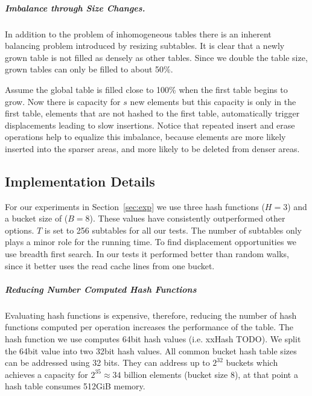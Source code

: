 \documentclass[a4paper,UKenglish]{lipics-v2016}
\begin{document}
\subparagraph*{Imbalance through Size Changes.}
In addition to the problem of inhomogeneous tables there is an
inherent balancing problem introduced by resizing subtables. It is
clear that a newly grown table is not filled as densely as other
tables.  Since we double the table size, grown tables can only be
filled to about 50\%.

Assume the global table is filled close to 100\% when the first table
begins to grow.  Now there is capacity for $s$ new elements but this
capacity is only in the first table, elements that are not hashed to
the first table, automatically trigger displacements leading to slow
insertions.  Notice that repeated insert and erase operations help to
equalize this imbalance, because elements are more likely inserted
into the sparser areas, and more likely to be deleted from denser
areas.


\subsection{Implementation Details}
For our experiments in Section~\ref{sec:exp} we use three hash
functions ($H=3$) and a bucket size of ($B=8$). These values have
consistently outperformed other options.  $T$ is set to 256
subtables for all our tests.  The number of subtables only plays a
minor role for the running time.  To find displacement opportunities
we use breadth first search.  In our tests it performed better than
random walks, since it better uses the read cache lines from one
bucket.

\subparagraph*{Reducing Number Computed Hash Functions}
Evaluating hash functions is expensive, therefore, reducing the number
of hash functions computed per operation increases the performance of
the table.  The hash function we use computes 64bit hash values
(i.e. xxHash TODO).  We split the 64bit value into two 32bit hash
values. All common bucket hash table sizes can be addressed using 32
bits. They can address up to $2^{32}$ buckets which achieves a
capacity for $2^{35} \approx 34$ billion elements (bucket size 8),
at that point a hash table consumes 512GiB memory.
\end{document}
